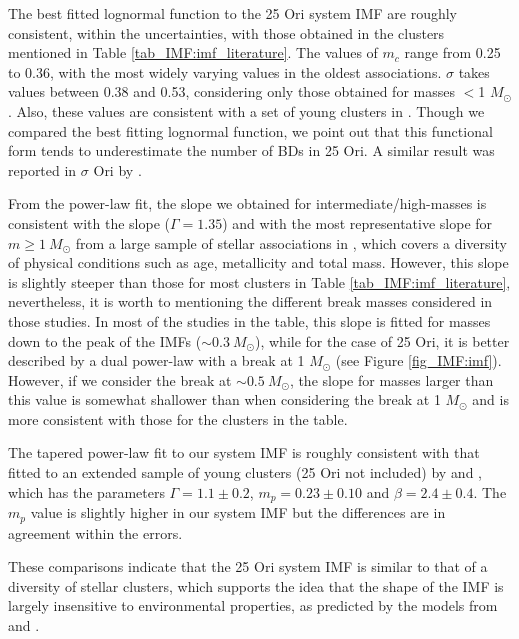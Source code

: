 \documentclass[12pt]{article}
\begin{document}
The best fitted lognormal function to the 25 Ori system IMF are roughly consistent, within the uncertainties, with those obtained in the clusters mentioned in Table \ref{tab_IMF:imf_literature}. The values of $m_c$ range from 0.25 to 0.36, with the most widely varying values in the oldest associations. $\sigma$ takes values between 0.38 and 0.53, considering only those obtained for masses $<$1 $M_\odot$. Also, these values are consistent with a set of young clusters in \citet{Bayo2011}. Though we compared the best fitting lognormal function, we point out that this functional form tends to underestimate the number of BDs in 25 Ori. A similar result was reported in $\sigma$ Ori by \citet{PenaRamirez2012}. 

From the power-law fit, the slope we obtained for intermediate/high-masses is consistent with the \citet{Salpeter1955} slope ($\Gamma=1.35$) and with the most representative slope for $m\ge1\ M_\odot$ from a large sample of stellar associations in \citet{Bastian2010}, which covers a diversity of physical conditions such as age, metallicity and total mass. However, this slope is slightly steeper than those for most clusters in Table \ref{tab_IMF:imf_literature}, nevertheless, it is worth to mentioning the different break masses considered in those studies. In most of the studies in the table, this slope is fitted for masses down to the peak of the IMFs ($\sim0.3\ M_\odot$), while for the case of 25 Ori, it is better described by a dual power-law with a break at 1 $M_\odot$ (see Figure \ref{fig_IMF:imf}). However, if we consider the break at $\sim0.5\ M_\odot$, the slope for masses larger than this value is somewhat shallower than when considering the break at 1 $M_\odot$ and is more consistent with those for the clusters in the table.

The tapered power-law fit to our system IMF is roughly consistent with that fitted to an extended sample of young clusters (25 Ori not included) by \citet{DeMarchi2010} and \citet{Bastian2010}, which has the parameters $\Gamma=1.1\pm0.2$, $m_p=0.23\pm0.10$ and $\beta=2.4\pm0.4$. The $m_p$ value is slightly higher in our system IMF but the differences are in agreement within the errors.

These comparisons indicate that the 25 Ori system IMF is similar to that of a diversity of stellar clusters, which supports the idea that the shape of the IMF is largely insensitive to environmental properties, as predicted by the models from \citet{Bonnell2006} and \citet{Elmegreen2008}.
\end{document}
